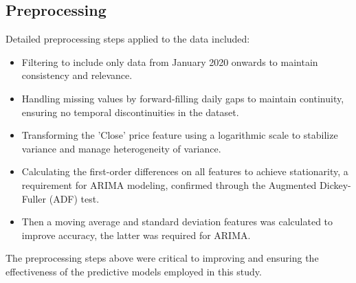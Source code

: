 \documentclass[conference]{IEEEtran}
\begin{document}
\subsection{Preprocessing}
Detailed preprocessing steps applied to the data included:
\begin{itemize}
    \item Filtering to include only data from January 2020 onwards to maintain consistency and relevance.
    \item Handling missing values by forward-filling daily gaps to maintain continuity, ensuring no temporal discontinuities in the dataset.
    \item Transforming the 'Close' price feature using a logarithmic scale to stabilize variance and manage heterogeneity of variance.
    \item Calculating the first-order differences on all features to achieve stationarity, a requirement for ARIMA modeling, confirmed through the Augmented Dickey-Fuller (ADF) test.
    \item Then a moving average and standard deviation features was calculated to improve accuracy, the latter was required for ARIMA.
\end{itemize}

The preprocessing steps above were critical to improving and ensuring the effectiveness of the predictive models employed in this study.
\end{document}
